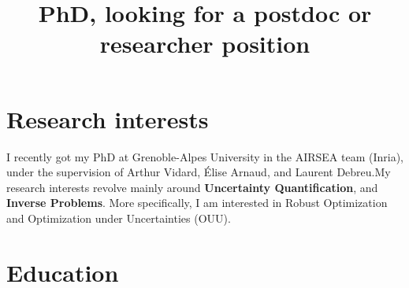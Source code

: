 \documentclass[11pt,a4paper,sans]{moderncv} %
\title{PhD, looking for a postdoc or researcher position} %
\begin{document}








\makecvtitle%

\section{Research interests}
I recently got my PhD at Grenoble-Alpes University in the AIRSEA team (Inria), under the supervision of Arthur Vidard, Élise Arnaud, and Laurent Debreu.\@ My research interests revolve mainly around \textbf{Uncertainty Quantification}, and \textbf{Inverse Problems}. More specifically, I am interested in Robust Optimization and Optimization under Uncertainties (OUU).
\section{Education}
\end{document}
